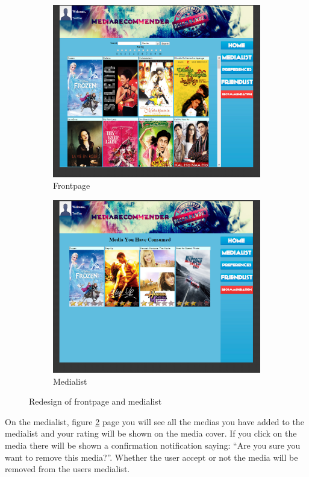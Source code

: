 \begin{figure}[H]
\centering
\begin{subfigure}{.5\textwidth}
  \centering
  \includegraphics[width=.9\linewidth]{Images/new-home.jpg}
  \caption{Frontpage}
  \label{fig:new-frontpage}
\end{subfigure}%
\begin{subfigure}{.5\textwidth}
  \centering
  \includegraphics[width=.9\linewidth]{Images/new-medialist.jpg}
  \caption{Medialist}
  \label{fig:new-medialist}
\end{subfigure}
\caption{Redesign of frontpage and medialist}
\label{fig:front-media}
\end{figure}

On the medialist, figure \ref{fig:new-medialist} page you will see all the medias you have added to the medialist and your rating will be shown on the media cover. If you click on the media there will be shown a confirmation notification saying: “Are you sure you want to remove this media?”. Whether the user accept or not the media will be removed from the users medialist.

